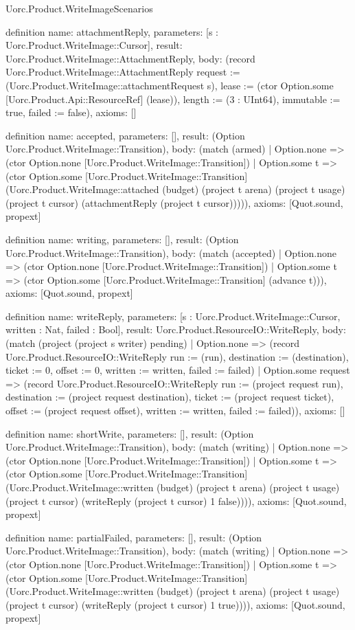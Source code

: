 \begin{lexlean}{Uorc.Product.WriteImageScenarios}
\begin{semanticmodule}
definition{
  name: attachmentReply,
  parameters: [s : Uorc.Product.WriteImage::Cursor],
  result: Uorc.Product.WriteImage::AttachmentReply,
  body: (record Uorc.Product.WriteImage::AttachmentReply {request := (Uorc.Product.WriteImage::attachmentRequest s), lease := (ctor Option.some [Uorc.Product.Api::ResourceRef] (lease)), length := (3 : UInt64), immutable := true, failed := false}),
  axioms: []
}

definition{
  name: accepted,
  parameters: [],
  result: (Option Uorc.Product.WriteImage::Transition),
  body: (match (armed)
    | Option.none => (ctor Option.none [Uorc.Product.WriteImage::Transition])
    | Option.some t => (ctor Option.some [Uorc.Product.WriteImage::Transition] (Uorc.Product.WriteImage::attached (budget) (project t arena) (project t usage) (project t cursor) (attachmentReply (project t cursor))))),
  axioms: [Quot.sound, propext]
}

definition{
  name: writing,
  parameters: [],
  result: (Option Uorc.Product.WriteImage::Transition),
  body: (match (accepted)
    | Option.none => (ctor Option.none [Uorc.Product.WriteImage::Transition])
    | Option.some t => (ctor Option.some [Uorc.Product.WriteImage::Transition] (advance t))),
  axioms: [Quot.sound, propext]
}

definition{
  name: writeReply,
  parameters: [s : Uorc.Product.WriteImage::Cursor, written : Nat, failed : Bool],
  result: Uorc.Product.ResourceIO::WriteReply,
  body: (match (project (project s writer) pending)
    | Option.none => (record Uorc.Product.ResourceIO::WriteReply {run := (run), destination := (destination), ticket := 0, offset := 0, written := written, failed := failed})
    | Option.some request => (record Uorc.Product.ResourceIO::WriteReply {run := (project request run), destination := (project request destination), ticket := (project request ticket), offset := (project request offset), written := written, failed := failed})),
  axioms: []
}

definition{
  name: shortWrite,
  parameters: [],
  result: (Option Uorc.Product.WriteImage::Transition),
  body: (match (writing)
    | Option.none => (ctor Option.none [Uorc.Product.WriteImage::Transition])
    | Option.some t => (ctor Option.some [Uorc.Product.WriteImage::Transition] (Uorc.Product.WriteImage::written (budget) (project t arena) (project t usage) (project t cursor) (writeReply (project t cursor) 1 false)))),
  axioms: [Quot.sound, propext]
}

definition{
  name: partialFailed,
  parameters: [],
  result: (Option Uorc.Product.WriteImage::Transition),
  body: (match (writing)
    | Option.none => (ctor Option.none [Uorc.Product.WriteImage::Transition])
    | Option.some t => (ctor Option.some [Uorc.Product.WriteImage::Transition] (Uorc.Product.WriteImage::written (budget) (project t arena) (project t usage) (project t cursor) (writeReply (project t cursor) 1 true)))),
  axioms: [Quot.sound, propext]
}


\end{semanticmodule}
\end{lexlean}
